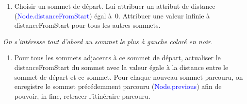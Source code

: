 \documentclass[,french]{article}
\providecommand{\tightlist}{%
  \setlength{\itemsep}{0pt}\setlength{\parskip}{0pt}}
\begin{document}
\begin{enumerate}
\def\labelenumi{\arabic{enumi}.}
\setcounter{enumi}{1}
\tightlist
\item
  Choisir un sommet de départ. Lui attribuer un attribut de distance
  (\textcolor{blue}{Node.distanceFromStart}) égal à~0. Attribuer une
  valeur infinie à distanceFromStart pour tous les autres sommets.
\end{enumerate}

\begin{center}
\usetikzlibrary{arrows.meta}
\end{center}
\begin{adjustwidth}{50pt}{50pt}
\begin{center}
\emph{On s’intéresse tout d’abord au sommet le plus à gauche coloré en noir.}
\end{center}
\end{adjustwidth}

\begin{enumerate}
\def\labelenumi{\arabic{enumi}.}
\setcounter{enumi}{2}
\tightlist
\item
  Pour tous les sommets adjacents à ce sommet de départ, actualiser le
  distanceFromStart du sommet avec la valeur égale à la distance entre
  le sommet de départ et ce sommet. Pour chaque nouveau sommet parcouru,
  on enregistre le sommet précédemment parcouru
  (\textcolor{blue}{Node.previous}) afin de pouvoir, in fine, retracer
  l'itinéraire parcouru.
\end{enumerate}
\end{document}
